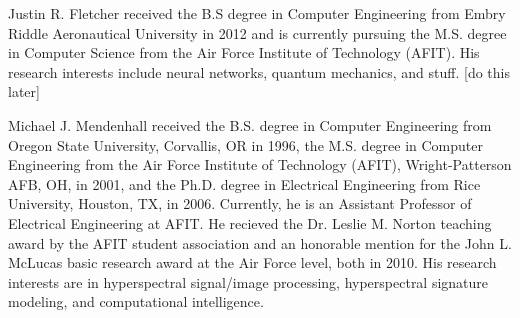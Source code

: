 \documentclass[10pt,journal,cspaper,compsoc]{IEEEtran}
\begin{document}





\begin{IEEEbiography} {Justin R. Fletcher} %
received the B.S degree in Computer Engineering from Embry Riddle Aeronautical University in 2012 and is currently pursuing the M.S. degree in Computer Science from the Air Force Institute of Technology (AFIT). His research interests include neural networks, quantum mechanics, and stuff. [do this later]
\end{IEEEbiography}


\begin{IEEEbiography}{Michael J. Mendenhall} %
	received the B.S. degree in Computer Engineering from Oregon State University, Corvallis, OR in 1996, the M.S. degree in Computer Engineering 
	from the Air Force Institute of Technology (AFIT), Wright-Patterson AFB, OH, in 2001, and the Ph.D. degree in Electrical Engineering from Rice 
	University, Houston, TX, in 2006. Currently, he is an Assistant Professor of Electrical Engineering at AFIT. He recieved the Dr. Leslie M. Norton 
	teaching award by the AFIT student association and an honorable mention for the John L. McLucas basic research award at the Air Force level, 
	both in 2010.  His research interests are in hyperspectral signal/image processing, hyperspectral signature modeling, and computational intelligence.  
\end{IEEEbiography}
\end{document}
